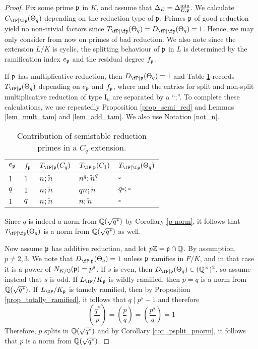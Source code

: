 \begin{proof}
    Fix some prime $\mathfrak{p}$ in $K$, and assume that $\Delta_E=\Delta_{E,\mathfrak{p}}^{\min}$. We calculate $\Cp(\Theta_q)$ depending on the reduction type of $\mathfrak{p}$. Primes $\mathfrak{p}$ of good reduction yield no non-trivial factors since $\Tp(\Theta_q)=\Dp(\Theta_q)=1$. Hence, we may only consider from now on primes of bad reduction. We also note since the extension $L/K$ is cyclic, the splitting behaviour of $\mathfrak{p}$ in $L$ is determined by the ramification index $e_{\mathfrak{p}}$ and the residual degree $f_{\mathfrak{p}}$. 
    
    If $\mathfrak{p}$ has multiplicative reduction, then $D_{\fP\mid\pp}(\Theta_q)=1$ and Table \ref{table_Cp} records $T_{\fP\mid\pp}(\Theta_q)$ depending on $e_{\mathfrak{p}}$ and $f_{\mathfrak{p}}$, where and the entries for split and non-split multiplicative reduction of type $\mathrm{I}_n$ are separated by a ``;''. To complete these calculations, we use repeatedly Proposition \ref{prop_semi_red} and Lemmas \ref{lem_mult_tam} and \ref{lem_add_tam}. We also use Notation \ref{not_n}.

    \begin{table}[!ht]
        \centering
        \begin{tabular}{|l|l|l|l|l|}
        \hline
        $e_{\mathfrak{p}}$ & $f_{\mathfrak{p}}$  & $T_{\fP\mid \pp}(C_q)$ & $T_{\fP\mid \pp}(C_1)$  & $\Tp(\Theta_q)$ \\ \hline
        $1$ & $1$ & $n;\tilde{n}$ & $n^q;\tilde{n}^q$ & $\square$ \\ \hline
        $q$ & $1$ & $n;\tilde{n}$ & $qn;\tilde{n}$ & $q\square;\square$ \\ \hline
        $1$ & $q$ & $n;\tilde{n}$ & $n;\tilde{n}$ & $\square$ \\ \hline
        \end{tabular}
        \caption{Contribution of semistable reduction primes in a $C_q$ extension.}
        \label{table_Cp}
    \end{table}

    Since $q$ is indeed a norm from $\mathbb{Q}(\sqrt{q^*})$ by Corollary \ref{p-norm}, it follows that $\Tp(\Theta_q)$ is a norm from $\mathbb{Q}(\sqrt{q^*})$ as well.

    Now assume $\mathfrak{p}$ has additive reduction, and let $p\mathbb{Z}=\mathfrak{p}\cap\mathbb{Q}$. By assumption, $p\neq2,3$. We note that $D_{\fP\mid\pp}(\Theta_q)=1$ unless $\mathfrak{p}$ ramifies in $F/K$, and in that case it is a power of $N_{K/\mathbb{Q}}(\mathfrak{p})=p^s$. If $s$ is even, then $D_{\fP\mid\pp}(\Theta_q)\in\QQss$, so assume instead that $s$ is odd. If $L_\fP/K_\pp$ is wildly ramified, then $p=q$ is a norm from $\mathbb{Q}(\sqrt{q^*})$. If $L_\fP/K_\pp$ is tamely ramified, then by Proposition \ref{prop_totally_ramified}, it follows that $q\mid p^s-1$ and therefore 
    \begin{equation}
        \left(\frac{q^*}{p}\right)=\left(\frac{p}{q}\right)=\left(\frac{p^s}{q}\right)=1
    \end{equation}
    Therefore, $p$ splits in $\mathbb{Q}(\sqrt{q^*})$ and by Corollary \ref{cor_psplit_pnorm}, it follows that $p$ is a norm from $\mathbb{Q}(\sqrt{q^*})$. 
    

\end{proof}
